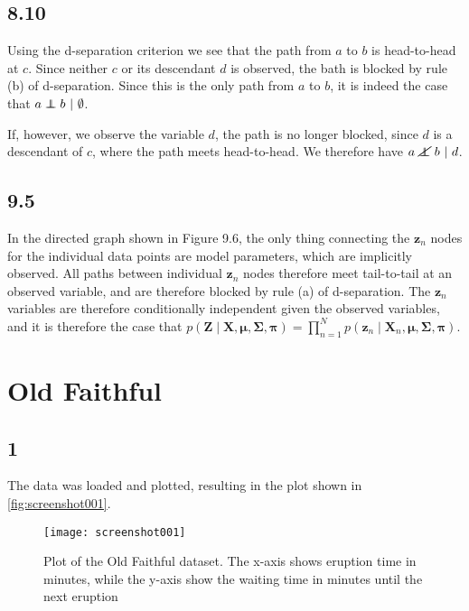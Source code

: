 \documentclass[a4paper, 12pt]{article}
\newcommand\independent{\protect\mathpalette{\protect\independenT}{\perp}}
\def\independenT#1#2{\mathrel{\rlap{$#1#2$}\mkern2mu{#1#2}}}
\begin{document}
\subsection{8.10}

Using the d-separation criterion we see that the path from $a$ to $b$ is head-to-head at $c$. Since neither $c$ or its descendant $d$ is observed, the bath is blocked by rule (b) of d-separation. Since this is the only path from $a$ to $b$, it is indeed the case that $a \independent b ~|~ \emptyset$.

If, however, we observe the variable $d$, the path is no longer blocked, since $d$ is a descendant of $c$, where the path meets head-to-head. We therefore have $a ~\cancel{\independent}~ b ~|~ d$.


\subsection{9.5}

In the directed graph shown in Figure 9.6, the only thing connecting the $\mathbf{z}_n$ nodes for the individual data points are model parameters, which are implicitly observed. All paths between individual $\mathbf{z}_n$ nodes therefore meet tail-to-tail at an observed variable, and are therefore blocked by rule (a) of d-separation. The $\mathbf{z}_n$ variables are therefore conditionally independent given the observed variables, and it is therefore the case that $p(\mathbf{Z} \mid \mathbf{X}, \mathbf{\mu}, \mathbf{\Sigma}, \mathbf{\pi})=\prod_{n=1}^{N} p\left(\mathbf{z}_{n} \mid \mathbf{X}_{n}, \mathbf{\mu}, \mathbf{\Sigma}, \mathbf{\pi}\right)$.


\section{Old Faithful}
\subsection{1}

The data was loaded and plotted, resulting in the plot shown in \autoref{fig:screenshot001}.

\begin{figure}[H]
	\centering
	\texttt{[image: screenshot001]}
	\caption{Plot of the Old Faithful dataset. The x-axis shows eruption time in minutes, while the y-axis show the waiting time in minutes until the next eruption}
	\label{fig:screenshot001}
\end{figure}
\end{document}
